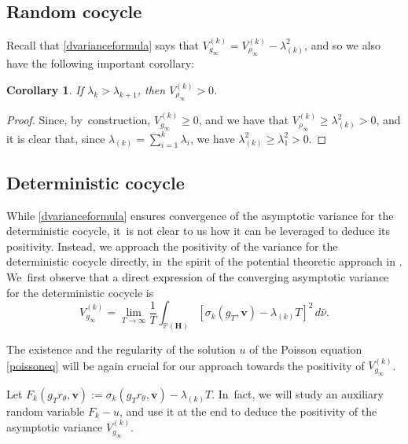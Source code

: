 \documentclass[JEP,XML,SOM,Unicode,published]{cedram}
\theoremstyle{plain}
\newtheorem{cor}[thm]{Corollary}
\theoremstyle{definition}
\numberwithin{equation}{subsection}
\newcommand\bP{\mathbb{P}}
\newcommand{\bfH}{\boldsymbol{H}}
\newcommand{\bfv}{\boldsymbol{v}}
\newcommand{\defeq}{:=}
\begin{document}
\subsection{Random cocycle}\label{vrclt}
Recall that \eqref{dvarianceformula} says that $V^{(k)}_{g_\infty} = V^{(k)}_{\rho_\infty} -\lambda_{(k)}^2$, and so we also have the following important corollary:
\begin{cor}
If $\lambda_k>\lambda_{k+1}$, then $V^{(k)}_{\rho_\infty} > 0$. \end{cor}
\begin{proof}
Since, by~construction, $V^{(k)}_{g_\infty}\geq 0$, and we have that $V^{(k)}_{\rho_\infty} \geq \lambda_{(k)}^2 >0$, and it is clear that, since $\lambda_{(k)} = \sum_{i=1}^k\lambda_i$, we have $\lambda_{(k)}^2 \geq \lambda_1^2>0$.
\end{proof}

\subsection{Deterministic cocycle}
\label{posvar:det}
While \eqref{dvarianceformula} ensures convergence of the asymptotic variance for the deterministic cocycle, it~is not clear to us how it can be leveraged to deduce its positivity. Instead, we approach the positivity of the variance for the deterministic cocycle directly, in~the spirit of the potential theoretic approach in \cite{For02}. We~first observe that a direct expression of the converging asymptotic variance for the deterministic cocycle is
\begin{equation}
\label{eq:det_var}
V^{(k)}_{g_\infty} = \lim_{T\to\infty} \frac{1}{T} \int_{\bP(\bfH)} \left[\sigma_k(g_T, \bfv) -\lambda_{(k)} T \right]^2 \,d\hat{\nu}.
\end{equation}

The existence and the regularity of the solution
$u$ of the Poisson equation \eqref{poissoneq} will be again crucial for our approach towards the positivity of $V^{(k)}_{g_\infty}$.

Let $F_k(g_T r_\theta,\bfv) \defeq \sigma_k(g_T r_\theta, \bfv) -\lambda_{(k)} T$. In~fact, we will study an auxiliary random variable $F_k- u$, and use it at the end to deduce the positivity of the asymptotic variance $V^{(k)}_{g_\infty}$.
\end{document}
